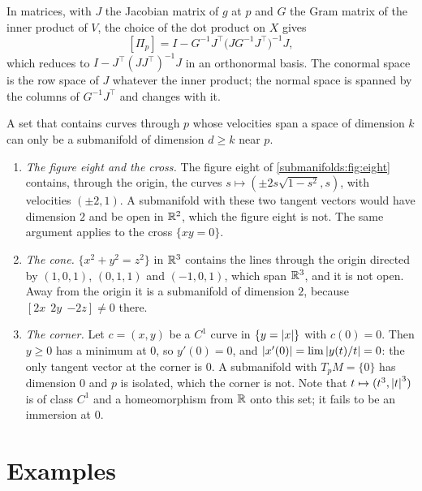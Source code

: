\begin{notechapter}
In matrices, with $J$ the Jacobian matrix of $g$ at $p$ and $G$ the Gram
matrix of the inner product of $V$, the choice of the dot product on $X$
gives
\[
  [\Pi_p] = I - G^{-1}J^\top\bigl(JG^{-1}J^\top\bigr)^{-1}J ,
\]
which reduces to $I - J^\top(JJ^\top)^{-1}J$ in an orthonormal basis. The
conormal space is the row space of $J$ whatever the inner product; the
normal space is spanned by the columns of $G^{-1}J^\top$ and changes with
it.

\begin{example}
\label{submanifolds:ex:not}
A set that contains curves through $p$ whose velocities span a space of
dimension $k$ can only be a submanifold of dimension $d\geq k$ near $p$.
\begin{enumerate}[nosep]
  \item \emph{The figure eight and the cross.} The figure eight of
        \cref{submanifolds:fig:eight} contains, through the origin, the
        curves $s\mapsto(\pm2s\sqrt{1 - s^2}, s)$, with velocities
        $(\pm2, 1)$. A submanifold with these two tangent vectors would
        have dimension $2$ and be open in $\mathbb{R}^2$, which the figure eight
        is not. The same argument applies to the cross $\{xy = 0\}$.
  \item \emph{The cone.} $\{x^2 + y^2 = z^2\}$ in $\mathbb{R}^3$ contains the
        lines through the origin directed by $(1, 0, 1)$, $(0, 1, 1)$ and
        $(-1, 0, 1)$, which span $\mathbb{R}^3$, and it is not open. Away from
        the origin it is a submanifold of dimension $2$, because
        $[2x\ \ 2y\ \ {-2z}]\neq0$ there.
  \item \emph{The corner.} Let $c = (x, y)$ be a $C^1$ curve in
        $\{y = \left|x\right|\}$ with $c(0) = 0$. Then $y\geq0$ has a minimum at
        $0$, so $y'(0) = 0$, and $\left|x'(0)\right| = \lim\left|y(t)/t\right| = 0$:
        the only tangent vector at the corner is $0$. A submanifold with
        $T_pM = \{0\}$ has dimension $0$ and $p$ is isolated, which the
        corner is not. Note that $t\mapsto(t^3, \left|t\right|^3)$ is of class
        $C^1$ and a homeomorphism from $\mathbb{R}$ onto this set; it fails to be
        an immersion at $0$.
\end{enumerate}
\end{example}

\section{Examples}\label{submanifolds:sec:examples}


\end{notechapter}

